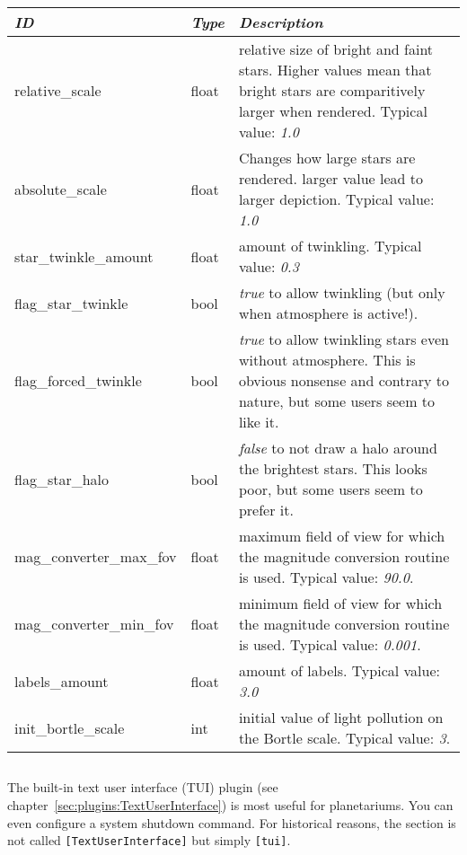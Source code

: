 \noindent%
\begin{tabularx}{\textwidth}{l|l|X}\toprule
\emph{ID}                & \emph{Type} & \emph{Description}\\\midrule
relative\_scale          & float       & relative size of bright and faint stars. Higher values mean that bright stars 
                                         are comparitively larger when rendered. Typical value: \emph{1.0}\\%
absolute\_scale          & float       & Changes how large stars are rendered. larger value lead to larger depiction. Typical value: \emph{1.0}\\%
star\_twinkle\_amount    & float       & amount of twinkling. Typical value: \emph{0.3}\\%
flag\_star\_twinkle      & bool        & \emph{true} to allow twinkling (but only when atmosphere is active!).\\%
flag\_forced\_twinkle    & bool        & \emph{true} to allow twinkling stars even without atmosphere. This is obvious nonsense and contrary to nature, but some users seem to like it.\\%
flag\_star\_halo         & bool        & \emph{false} to not draw a halo around the brightest stars. This looks poor, but some users seem to prefer it.\\%
mag\_converter\_max\_fov & float       & maximum field of view for which the magnitude conversion routine is used. Typical value: \emph{90.0}.\\%
mag\_converter\_min\_fov & float       & minimum field of view for which the magnitude conversion routine is used. Typical value: \emph{0.001}.\\%
labels\_amount           & float       & amount of labels. Typical value: \emph{3.0}\\%
init\_bortle\_scale      & int         & initial value of light pollution on the Bortle scale. Typical value: \emph{3}.\\\bottomrule
\end{tabularx}

\subsection{}

The built-in text user interface (TUI) plugin (see chapter~\ref{sec:plugins:TextUserInterface}) is most useful for planetariums. You can even configure a system shutdown command. 
For historical reasons, the section is not called \texttt{[TextUserInterface]} but simply \texttt{[tui]}.

